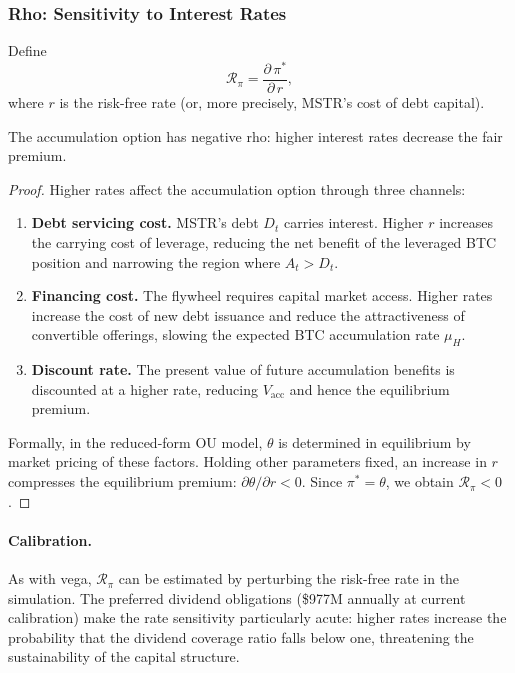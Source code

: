 \subsubsection{Rho: Sensitivity to Interest Rates}

\begin{definition}\label{def:rho-premium}
Define
$$
  \mathcal{R}_\pi
  = \frac{\partial\,\pi^*}{\partial\,r},
$$
where $r$ is the risk-free rate (or, more precisely, MSTR's cost of debt
capital).
\end{definition}

\begin{proposition}\label{prop:rho-negative}
The accumulation option has negative rho: higher interest rates decrease
the fair premium.
\end{proposition}

\begin{proof}
Higher rates affect the accumulation option through three channels:
\begin{enumerate}
  \item \textbf{Debt servicing cost.}  MSTR's debt $D_t$ carries interest.
    Higher $r$ increases the carrying cost of leverage, reducing the net
    benefit of the leveraged BTC position and narrowing the region where
    $A_t > D_t$.

  \item \textbf{Financing cost.}  The flywheel requires capital market
    access.  Higher rates increase the cost of new debt issuance and
    reduce the attractiveness of convertible offerings, slowing the
    expected BTC accumulation rate $\mu_H$.

  \item \textbf{Discount rate.}  The present value of future accumulation
    benefits is discounted at a higher rate, reducing $V_{\mathrm{acc}}$
    and hence the equilibrium premium.
\end{enumerate}

Formally, in the reduced-form OU model, $\theta$ is determined in
equilibrium by market pricing of these factors.  Holding other parameters
fixed, an increase in $r$ compresses the equilibrium premium:
$\partial\theta/\partial r < 0$.  Since $\pi^* = \theta$, we obtain
$\mathcal{R}_\pi < 0$.
\end{proof}

\paragraph{Calibration.}
As with vega, $\mathcal{R}_\pi$ can be estimated by perturbing the
risk-free rate in the simulation.  The preferred dividend obligations
(\$977M annually at current calibration) make the rate sensitivity
particularly acute: higher rates increase the probability that the
dividend coverage ratio falls below one, threatening the sustainability
of the capital structure.

